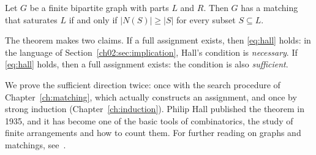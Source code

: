 \par\noindent\begin{minipage}{\linewidth}
\begin{theorem}\label{thm:hall}
Let $G$ be a finite bipartite graph with parts $L$ and $R$. Then $G$ has a matching that saturates $L$ if and only if $|N(S)|\ge|S|$ for every subset $S\subseteq L$.
\end{theorem}
\end{minipage}\par

The theorem makes two claims. If a full assignment exists, then \eqref{eq:hall} holds: in the language of Section~\ref{ch02:sec:implication}, Hall's condition is \emph{necessary}. If \eqref{eq:hall} holds, then a full assignment exists: the condition is also \emph{sufficient}.

We prove the sufficient direction twice: once with the search procedure of Chapter~\ref{ch:matching}, which actually constructs an assignment, and once by strong induction (Chapter~\ref{ch:induction}). Philip Hall published the theorem in 1935, and it has become one of the basic tools of combinatorics, the study of finite arrangements and how to count them. For further reading on graphs and matchings, see~\cite{mcs}.

